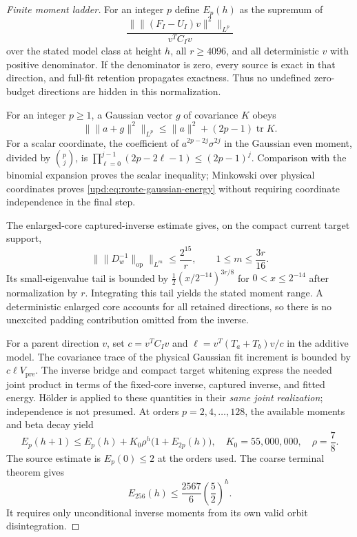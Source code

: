 \documentclass[11pt,oneside,openany,a4paper]{book}
\numberwithin{equation}{chapter}
\theoremstyle{definition}
\theoremstyle{remark}
\DeclareMathOperator{\tr}{tr}\DeclareMathOperator{\rank}{rank}
\begin{document}
\begin{proof}[Finite moment ladder]
For an integer $p$ define $E_p(h)$ as the supremum of
\[
 \frac{\|\lVert(F_I-U_I)v\rVert^2\|_{L^p}}{v^TC_Iv}
\]
over the stated model class at height $h$, all $r\geq4096$, and all
deterministic $v$ with positive denominator.  If the denominator is
zero, every source is exact in that direction, and full-fit retention
propagates exactness.  Thus no undefined zero-budget directions are
hidden in this normalization.

For an integer $p\geq1$, a Gaussian vector $g$ of covariance $K$ obeys
\begin{equation}
 \|\lVert a+g\rVert^2\|_{L^p}
 \leq\lVert a\rVert^2+(2p-1)\tr K.
 \label{upd:eq:route-gaussian-energy}
\end{equation}
For a scalar coordinate, the coefficient of
$a^{2p-2j}\sigma^{2j}$ in the Gaussian even moment, divided by
$\binom pj$, is
$\prod_{\ell=0}^{j-1}(2p-2\ell-1)\leq(2p-1)^j$.
Comparison with the binomial expansion proves the scalar inequality;
Minkowski over physical coordinates proves
\eqref{upd:eq:route-gaussian-energy} without requiring coordinate
independence in the final step.

The enlarged-core captured-inverse estimate gives, on the compact
current target support,
\[
 \bigl\|\lVert D_w^{-1}\rVert_{\mathrm{op}}\bigr\|_{L^m}
 \leq\frac{2^{15}}r,
 \qquad1\leq m\leq\frac{3r}{16}.
\]
Its small-eigenvalue tail is bounded by
$\tfrac12(x/2^{-14})^{3r/8}$ for $0<x\leq2^{-14}$ after normalization
by $r$.  Integrating this tail yields the stated moment range.  A
deterministic enlarged core accounts for all retained directions, so
there is no unexcited padding contribution omitted from the inverse.

For a parent direction $v$, set $c=v^TC_Iv$ and
$\ell=v^T(T_a+T_b)v/c$ in the additive model.  The covariance trace of
the physical Gaussian fit increment is bounded by
$c\ell V_{\mathrm{pre}}$.  The inverse bridge and compact target
whitening express the needed joint product in terms of the fixed-core
inverse, captured inverse, and fitted energy.  Hölder is applied to
these quantities in their \emph{same joint realization}; independence
is not presumed.  At orders $p=2,4,\ldots,128$, the available moments
and beta decay yield
\begin{equation}
 E_p(h+1)\leq E_p(h)
       +K_0\rho^h\bigl(1+E_{2p}(h)\bigr),
 \quad K_0=55{,}000{,}000,\quad \rho=\frac78.
 \label{upd:eq:route-moment-ladder}
\end{equation}
The source estimate is $E_p(0)\leq2$ at the orders used.  The coarse
terminal theorem gives
\begin{equation}
 E_{256}(h)\leq\frac{2567}{6}\left(\frac52\right)^h.
 \label{upd:eq:route-terminal}
\end{equation}
It requires only unconditional inverse moments from its own valid
orbit disintegration.


\end{proof}
\end{document}

